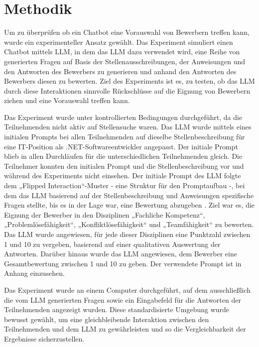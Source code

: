 
\chapter{Methodik}

Um zu überprüfen ob ein Chatbot eine Vorauswahl von Bewerbern treffen kann, wurde ein experimenteller Ansatz gewählt. 
Das Experiment simuliert einen Chatbot mittels \acs{LLM}, in dem das \acs{LLM} dazu verwendet wird, 
eine Reihe von generierten Fragen auf Basis der Stellenausschreibungen,
der Anweisungen und den Antworten des Bewerbers zu generieren und anhand den Antworten des Bewerbers 
diesen zu bewerten. Ziel des Experiments ist es, zu testen, ob das \acs{LLM} durch diese Interaktionen 
sinnvolle Rückschlüsse auf die Eignung von Bewerbern ziehen und eine Vorauswahl treffen kann.


Das Experiment wurde unter kontrollierten Bedingungen durchgeführt, da die Teilnehmenden nicht aktiv auf Stellensuche waren. 
Das \acs{LLM} wurde mittels eines initialen Prompts bei allen Teilnehmenden auf dieselbe Stellenbeschreibung 
für eine IT-Position als .NET-Softwareentwickler angepasst. Der initiale Prompt blieb in allen 
Durchläufen für die unterschiedlichen Teilnehmenden gleich. Die Teilnehmer konnten den initialen Prompt und die Stellenbeschreibung vor und während 
des Experiments nicht einsehen. 
Der initiale Prompt des \acs{LLM} folgte dem „Flipped Interaction“-Muster - eine Struktur für den Promptaufbau -, bei dem das \acs{LLM} basierend 
auf der Stellenbeschreibung und Anweisungen spezifische Fragen stellte, bis es in der Lage war, 
eine Bewertung abzugeben \cite{white:2023}. Ziel war es, die Eignung der Bewerber in den Disziplinen 
„Fachliche Kompetenz“, „Problemlösefähigkeit“, „Konfliktlösefähigkeit“ und „Teamfähigkeit“ zu 
bewerten. Das \acs{LLM} wurde angewiesen, für jede dieser Disziplinen eine Punktzahl zwischen 1 und 10 
zu vergeben, basierend auf einer qualitativen Auswertung der Antworten. Darüber hinaus wurde das \acs{LLM} 
angewiesen, dem Bewerber eine Gesamtbewertung zwischen 1 und 10 zu geben. Der verwendete Prompt 
ist in Anhang  einzusehen. 


Das Experiment wurde an einem Computer durchgeführt, auf dem ausschließlich die vom \acs{LLM} 
generierten Fragen sowie ein Eingabefeld für die Antworten der Teilnehmenden angezeigt wurden. 
Diese standardisierte Umgebung wurde bewusst gewählt, um eine gleichbleibende Interaktion zwischen 
den Teilnehmenden und dem \acs{LLM} zu gewährleisten und so die Vergleichbarkeit der Ergebnisse 
sicherzustellen. 


